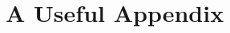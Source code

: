 \documentclass[../thesis.tex]{subfiles}
\begin{document}
    \chapter{A Useful Appendix}
    \blindtext[4]
\end{document}
